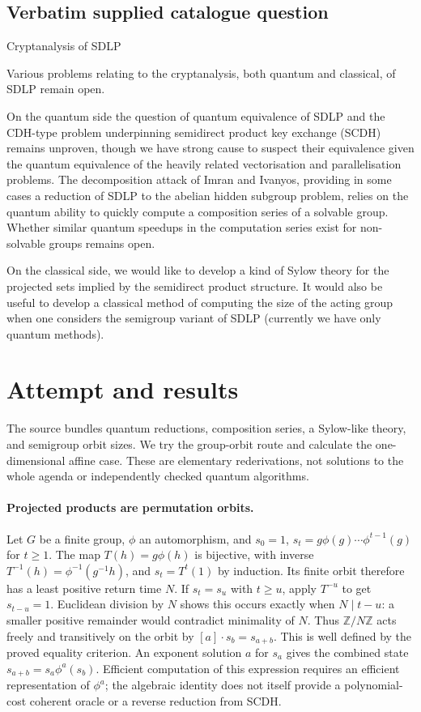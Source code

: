 \documentclass[11pt]{article}
\begin{document}
\subsection{Verbatim supplied catalogue question}
Cryptanalysis of SDLP

Various problems relating to the cryptanalysis, both quantum and classical, of SDLP remain open.

On the quantum side the question of quantum equivalence of SDLP and the CDH-type problem underpinning semidirect product key exchange (SCDH) remains unproven, though we have strong cause to suspect their equivalence given the quantum equivalence of the heavily related vectorisation and parallelisation problems. The decomposition attack of Imran and Ivanyos, providing in some cases a reduction of SDLP to the abelian hidden subgroup problem, relies on the quantum ability to quickly compute a composition series of a solvable group. Whether similar quantum speedups in the computation series exist for non-solvable groups remains open.

On the classical side, we would like to develop a kind of Sylow theory for the projected sets implied by the semidirect product structure. It would also be useful to develop a classical method of computing the size of the acting group when one considers the semigroup variant of SDLP (currently we have only quantum methods).

\section{Attempt and results}
The source bundles quantum reductions, composition series, a Sylow-like theory,
and semigroup orbit sizes. We try the group-orbit route and calculate the
one-dimensional affine case. These are elementary rederivations, not solutions
to the whole agenda or independently checked quantum algorithms.

\paragraph{Projected products are permutation orbits.}
Let $G$ be a finite group, $\phi$ an automorphism, and
$s_0=1$, $s_t=g\phi(g)\cdots\phi^{t-1}(g)$ for $t\ge1$.
The map $T(h)=g\phi(h)$ is bijective, with inverse
$T^{-1}(h)=\phi^{-1}(g^{-1}h)$, and $s_t=T^t(1)$ by induction.
Its finite orbit therefore has a least positive return time $N$.
If $s_t=s_u$ with $t\ge u$, apply $T^{-u}$ to get $s_{t-u}=1$.
Euclidean division by $N$ shows this occurs exactly when $N\mid t-u$:
a smaller positive remainder would contradict minimality of $N$.
Thus $\mathbb Z/N\mathbb Z$ acts freely and transitively on the orbit by
$[a]\cdot s_b=s_{a+b}$. This is well defined by the proved equality criterion.
An exponent solution $a$ for $s_a$ gives the combined state
$s_{a+b}=s_a\phi^a(s_b)$. Efficient computation of this expression requires
an efficient representation of $\phi^a$; the algebraic identity does not itself
provide a polynomial-cost coherent oracle or a reverse reduction from SCDH.
\end{document}
